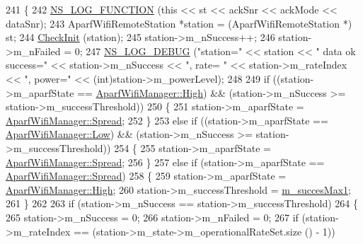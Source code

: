 \begin{DoxyCode}
241 \{
242   \hyperlink{log-macros-disabled_8h_a90b90d5bad1f39cb1b64923ea94c0761}{NS\_LOG\_FUNCTION} (\textcolor{keyword}{this} << st << ackSnr << ackMode << dataSnr);
243   AparfWifiRemoteStation *station = (AparfWifiRemoteStation *) st;
244   \hyperlink{classns3_1_1AparfWifiManager_a98a3fc4dfff3bcc1bc452dfed963576f}{CheckInit} (station);
245   station->m\_nSuccess++;
246   station->m\_nFailed = 0;
247   \hyperlink{group__logging_ga413f1886406d49f59a6a0a89b77b4d0a}{NS\_LOG\_DEBUG} (\textcolor{stringliteral}{"station="} << station << \textcolor{stringliteral}{" data ok success="} << station->m\_nSuccess << \textcolor{stringliteral}{", rate=
      "} << station->m\_rateIndex << \textcolor{stringliteral}{", power="} << (\textcolor{keywordtype}{int})station->m\_powerLevel);
248 
249   \textcolor{keywordflow}{if} ((station->m\_aparfState == \hyperlink{classns3_1_1AparfWifiManager_a5b338779a4468212d544d6830f1a8237a350c9255ae87bc64460977ff6aa9b45d}{AparfWifiManager::High}) && (station->m\_nSuccess >= 
      station->m\_successThreshold))
250     \{
251       station->m\_aparfState = \hyperlink{classns3_1_1AparfWifiManager_a5b338779a4468212d544d6830f1a8237aaad961d0bc4608abdca01806c95e059b}{AparfWifiManager::Spread};
252     \}
253   \textcolor{keywordflow}{else} \textcolor{keywordflow}{if} ((station->m\_aparfState == \hyperlink{classns3_1_1AparfWifiManager_a5b338779a4468212d544d6830f1a8237adfadee30861b99e197d83af798d5e8b9}{AparfWifiManager::Low}) && (station->m\_nSuccess >=
       station->m\_successThreshold))
254     \{
255       station->m\_aparfState = \hyperlink{classns3_1_1AparfWifiManager_a5b338779a4468212d544d6830f1a8237aaad961d0bc4608abdca01806c95e059b}{AparfWifiManager::Spread};
256     \}
257   \textcolor{keywordflow}{else} \textcolor{keywordflow}{if} (station->m\_aparfState == \hyperlink{classns3_1_1AparfWifiManager_a5b338779a4468212d544d6830f1a8237aaad961d0bc4608abdca01806c95e059b}{AparfWifiManager::Spread})
258     \{
259       station->m\_aparfState = \hyperlink{classns3_1_1AparfWifiManager_a5b338779a4468212d544d6830f1a8237a350c9255ae87bc64460977ff6aa9b45d}{AparfWifiManager::High};
260       station->m\_successThreshold = \hyperlink{classns3_1_1AparfWifiManager_ab192aa4160ffefa93e47301ad682ccaa}{m\_succesMax1};
261     \}
262 
263   \textcolor{keywordflow}{if} (station->m\_nSuccess == station->m\_successThreshold)
264     \{
265       station->m\_nSuccess = 0;
266       station->m\_nFailed = 0;
267       \textcolor{keywordflow}{if} (station->m\_rateIndex == (station->m\_state->m\_operationalRateSet.size () - 1))

\end{DoxyCode}

